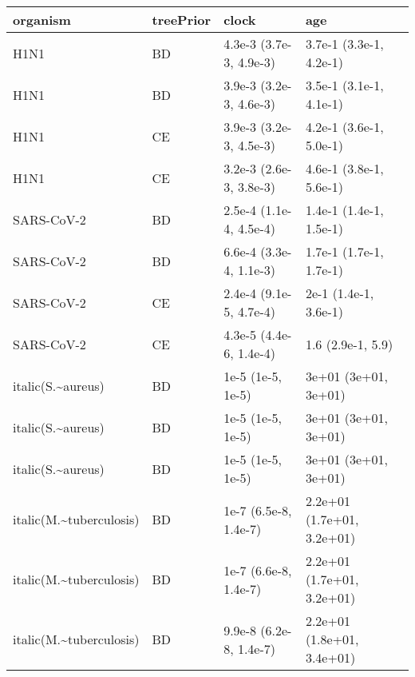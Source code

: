 
\begin{tabular}{llll}
\toprule
organism & treePrior & clock & age\\
\midrule
H1N1 & BD & 4.3e-3 (3.7e-3, 4.9e-3) & 3.7e-1 (3.3e-1, 4.2e-1)\\
H1N1 & BD & 3.9e-3 (3.2e-3, 4.6e-3) & 3.5e-1 (3.1e-1, 4.1e-1)\\
H1N1 & CE & 3.9e-3 (3.2e-3, 4.5e-3) & 4.2e-1 (3.6e-1, 5.0e-1)\\
H1N1 & CE & 3.2e-3 (2.6e-3, 3.8e-3) & 4.6e-1 (3.8e-1, 5.6e-1)\\
SARS-CoV-2 & BD & 2.5e-4 (1.1e-4, 4.5e-4) & 1.4e-1 (1.4e-1, 1.5e-1)\\
\addlinespace
SARS-CoV-2 & BD & 6.6e-4 (3.3e-4, 1.1e-3) & 1.7e-1 (1.7e-1, 1.7e-1)\\
SARS-CoV-2 & CE & 2.4e-4 (9.1e-5, 4.7e-4) & 2e-1 (1.4e-1, 3.6e-1)\\
SARS-CoV-2 & CE & 4.3e-5 (4.4e-6, 1.4e-4) & 1.6 (2.9e-1, 5.9)\\
italic(S.\textasciitilde{}aureus) & BD & 1e-5 (1e-5, 1e-5) & 3e+01 (3e+01, 3e+01)\\
italic(S.\textasciitilde{}aureus) & BD & 1e-5 (1e-5, 1e-5) & 3e+01 (3e+01, 3e+01)\\
\addlinespace
italic(S.\textasciitilde{}aureus) & BD & 1e-5 (1e-5, 1e-5) & 3e+01 (3e+01, 3e+01)\\
italic(M.\textasciitilde{}tuberculosis) & BD & 1e-7 (6.5e-8, 1.4e-7) & 2.2e+01 (1.7e+01, 3.2e+01)\\
italic(M.\textasciitilde{}tuberculosis) & BD & 1e-7 (6.6e-8, 1.4e-7) & 2.2e+01 (1.7e+01, 3.2e+01)\\
italic(M.\textasciitilde{}tuberculosis) & BD & 9.9e-8 (6.2e-8, 1.4e-7) & 2.2e+01 (1.8e+01, 3.4e+01)\\
\bottomrule
\end{tabular}
